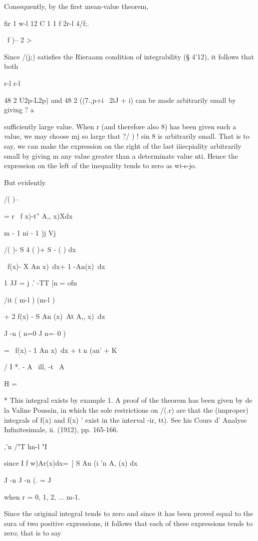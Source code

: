 Consequently, by the first mean-value theorem,

fir 1 w-l 12 C 1 1 f 2r-l 4/f;. \

\ f )-- 2 >%

Since /(j;) satisfies the Rieraann condition of integrability (§
4'12), it follows that both

r-l r-l

48 2 U2p-L2p) and 48 2 ((7.,p+i~ 2iJ + i) can be made arbitrarily
small by giving ? a

sufficiently large value. When r (and therefore also 8) has been given
such a value, we may choose mj so large that ?/ ) ! sin 8 is
arbitrarily small. That is to say, we can make the expression on the
right of the last iiiecpiality arbitrarily small by giving m any value
greater than a determinate value nti. Hence the expression on the left
of the inequality tends to zero as wi-s-jo.

But evidently

/( )-- %

= r \ f x)-t'' A,, x)Xdx

m - 1 ni - 1 )j Vj

/( )- S 4 ( )+ S - ( ) dx

\ f(x)- X An x)\ dx+ 1 -An(x)\ dx

1 JJ = j .' -TT [n = ofn

/it ( m-l ) (m-l )

+ 2 f(x) - S An (x)\ At A,, x)\ dx

J -n ( n=0 J n=--0 )

= \ f(x) - 1 An x)\ dx + t n (an' + K

/ I *. - A \ ill, -t \ A

H =

* This integral exists by example 1. A proof of the theorem has
been given by de la Valine Poussin, in which the sole restrictions on
/(.r) are that the (improper) integrals of f(x) and f(x) ' exist in
the interval -ir, tt). See his Cours d' Analyse Infinitesimale, ii.
(1912), pp. 165-166.

%
%

,'n /"T hn-l "I

since I f w)Ar(x)dx=\ ] S An (i 'n A, (x) dx

J -n J -n (. = J

when r = 0, 1, 2, ... m-1.

Since the original integral tends to zero and since it has been proved
equal to the sura of two positive expressions, it follows that each of
these expressions tends to zero; that is to say

